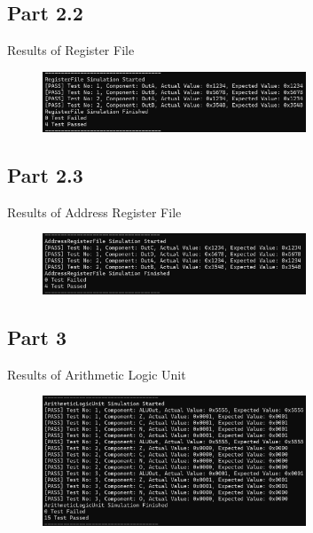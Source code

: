 \documentclass[pdftex,12pt,a4paper]{article}
\begin{document}
\subsection{Part 2.2}
Results of Register File \par
\begin{figure}[htbp]
	\centering
	\includegraphics[width=0.7\textwidth]{RF}
\end{figure}
\newpage
\subsection{Part 2.3}
Results of Address Register File \par
\begin{figure}[htbp]
	\centering
	\includegraphics[width=0.7\textwidth]{ARF}
\end{figure}
\subsection{Part 3}
Results of Arithmetic Logic Unit \par
\begin{figure}[H]
	\centering
	\includegraphics[width=0.7\textwidth]{ALU}
\end{figure}
\newpage
\end{document}
